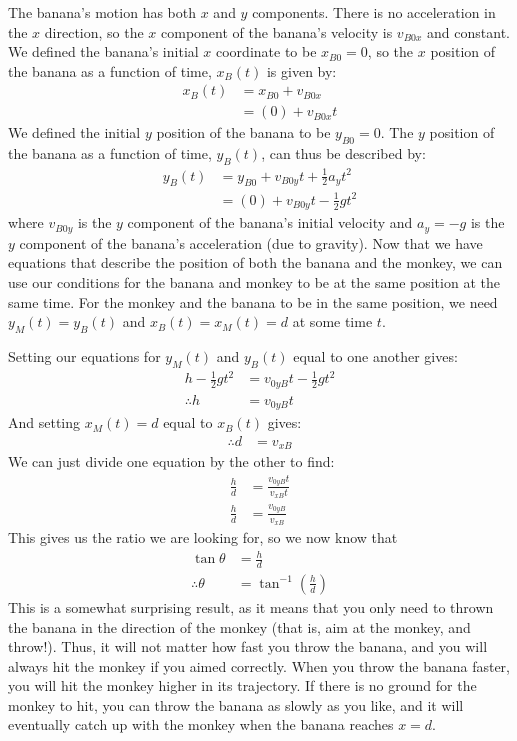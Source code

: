 \begin{example}
The banana's motion has both $x$ and $y$ components. There is no acceleration in the $x$ direction, so the $x$ component of the banana's velocity is $v_{B0x}$ and constant. We defined the banana's initial $x$ coordinate to be $x_{B0}=0$, so the $x$ position of the banana as a function of time, $x_B(t)$ is given by:
\begin{align*}
x_B(t)&=x_{B0}+v_{B0x}\\
&=(0)+v_{B0x}t
\end{align*}
We defined the initial $y$ position of the banana to be $y_{B0}=0$. The $y$ position of the banana as a function of time, $y_B(t)$, can thus be described by:
\begin{align*}
y_B(t)&=y_{B0}+v_{B0y}t+\frac{1}{2}a_yt^2\\
&=(0)+v_{B0y}t-\frac{1}{2}gt^2
\end{align*}
where $v_{B0y}$ is the $y$ component of the banana's initial velocity and $a_y=-g$ is the $y$ component of the banana's acceleration (due to gravity). Now that we have equations that describe the position of both the banana and the monkey, we can use our conditions for the banana and monkey to be at the same position at the same time. For the monkey and the banana to be in the same position, we need $y_M(t)=y_B(t)$ and $x_B(t)=x_M(t) =d$ at some time $t$.

Setting our equations for $y_M(t)$ and $y_B(t)$ equal to one another gives:
\begin{align*}
h-\frac{1}{2} gt^2&=v_{0yB}t-\frac{1}{2}gt^2\\
\therefore h&=v_{0yB}t
\end{align*}
And setting $x_M(t)=d$ equal to $x_B(t)$ gives:
\begin{align*}
\therefore d&=v_{xB}
\end{align*} 
We can just divide one equation by the other to find:
\begin{align*}
\frac{h}{d}&=\frac{v_{0yB}t}{v_{xB}t}\\
\frac{h}{d}&=\frac{v_{0yB}}{v_{xB}}
\end{align*}
This gives us the ratio we are looking for, so we now know that
\begin{align*}
\tan\theta&=\frac{h}{d}\\
\therefore \theta&=\tan^{-1}\left(\frac{h}{d}\right)
\end{align*}
This is a somewhat surprising result, as it means that you only need to thrown the banana in the direction of the monkey (that is, aim at the monkey, and throw!). Thus, it will not matter how fast you throw the banana, and you will always hit the monkey if you aimed correctly. When you throw the banana faster, you will hit the monkey higher in its trajectory. If there is no ground for the monkey to hit, you can throw the banana as slowly as you like, and it will eventually catch up with the monkey when the banana reaches $x=d$.
\end{example} 


